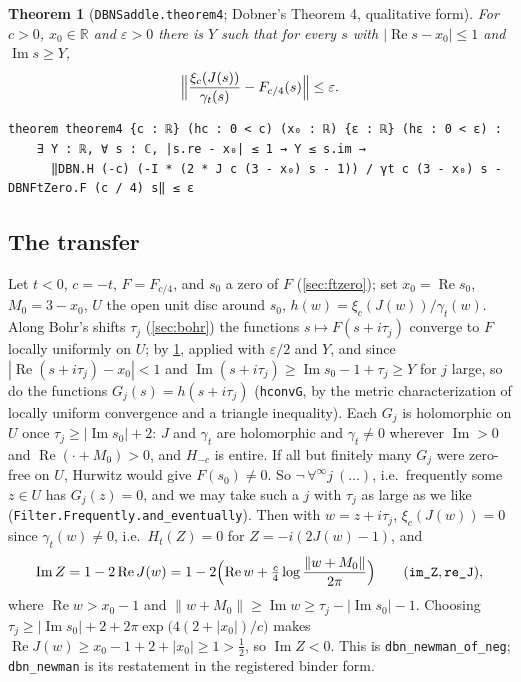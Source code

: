 \documentclass[11pt]{article}
\newtheorem{theorem}{Theorem}
\theoremstyle{definition}
\newcommand{\lean}[1]{\texttt{#1}}
\newcommand{\Hfun}{H}
\newcommand{\re}{\operatorname{Re}}
\newcommand{\im}{\operatorname{Im}}
\newcommand{\R}{\mathbb{R}}
\begin{document}
\begin{theorem}[\lean{DBNSaddle.theorem4}; Dobner's Theorem 4, qualitative form]\label{thm:thm4}
For $c > 0$, $x_0 \in \R$ and $\varepsilon > 0$ there is $Y$ such that for every $s$ with $|\re s - x_0| \le 1$ and $\im s \ge Y$,
\[
\Bigl\|\frac{\xi_c(J(s))}{\gamma_t(s)} - F_{c/4}(s)\Bigr\| \le \varepsilon .
\]
\end{theorem}

\begin{lstlisting}
theorem theorem4 {c : ℝ} (hc : 0 < c) (x₀ : ℝ) {ε : ℝ} (hε : 0 < ε) :
    ∃ Y : ℝ, ∀ s : ℂ, |s.re - x₀| ≤ 1 → Y ≤ s.im →
      ‖DBN.H (-c) (-I * (2 * J c (3 - x₀) s - 1)) / γt c (3 - x₀) s - DBNFtZero.F (c / 4) s‖ ≤ ε
\end{lstlisting}

\subsection{The transfer}\label{sec:transfer}

Let $t < 0$, $c = -t$, $F = F_{c/4}$, and $s_0$ a zero of $F$ (\cref{sec:ftzero}); set $x_0 = \re s_0$, $M_0 = 3 - x_0$, $U$ the open unit disc around $s_0$, $h(w) = \xi_c(J(w))/\gamma_t(w)$. Along Bohr's shifts $\tau_j$ (\cref{sec:bohr}) the functions $s \mapsto F(s + i\tau_j)$ converge to $F$ locally uniformly on $U$; by \cref{thm:thm4}, applied with $\varepsilon/2$ and $Y$, and since $|\re(s + i\tau_j) - x_0| < 1$ and $\im(s + i\tau_j) \ge \im s_0 - 1 + \tau_j \ge Y$ for $j$ large, so do the functions $G_j(s) = h(s + i\tau_j)$ (\lean{hconvG}, by the metric characterization of locally uniform convergence and a triangle inequality). Each $G_j$ is holomorphic on $U$ once $\tau_j \ge |\im s_0| + 2$: $J$ and $\gamma_t$ are holomorphic and $\gamma_t \ne 0$ wherever $\im > 0$ and $\re(\cdot + M_0) > 0$, and $\Hfun_{-c}$ is entire. If all but finitely many $G_j$ were zero-free on $U$, Hurwitz would give $F(s_0) \ne 0$. So $\neg\,\forall^\infty j\ (\dots)$, i.e.\ frequently some $z \in U$ has $G_j(z) = 0$, and we may take such a $j$ with $\tau_j$ as large as we like (\lean{Filter.Frequently.and\_eventually}). Then with $w = z + i\tau_j$, $\xi_c(J(w)) = 0$ since $\gamma_t(w) \ne 0$, i.e.\ $\Hfun_t(Z) = 0$ for $Z = -i(2J(w) - 1)$, and
\[
\im Z = 1 - 2\re J(w) = 1 - 2\Bigl(\re w + \tfrac{c}{4}\log\frac{\|w + M_0\|}{2\pi}\Bigr)
\qquad(\lean{im\_Z}, \lean{re\_J}),
\]
where $\re w > x_0 - 1$ and $\|w + M_0\| \ge \im w \ge \tau_j - |\im s_0| - 1$. Choosing $\tau_j \ge |\im s_0| + 2 + 2\pi\exp\bigl(4(2 + |x_0|)/c\bigr)$ makes $\re J(w) \ge x_0 - 1 + 2 + |x_0| \ge 1 > \tfrac12$, so $\im Z < 0$. This is \lean{dbn\_newman\_of\_neg}; \lean{dbn\_newman} is its restatement in the registered binder form.
\end{document}
